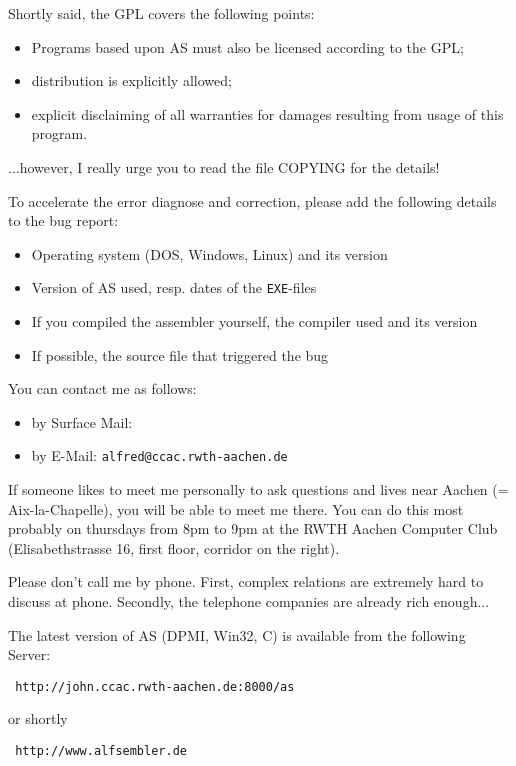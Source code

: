 \documentclass[12pt,twoside]{report}
\newcommand{\tty}[1]{{\tt #1}}
\newcommand{\asname}{{AS}}
\begin{document}
Shortly said, the GPL covers the following points:
\begin{itemize}
\item{Programs based upon \asname{} must also be licensed according to the GPL;}
\item{distribution is explicitly allowed;}
\item{explicit disclaiming of all warranties for damages resulting from
      usage of this program.}
\end{itemize}
...however, I really urge you to read the file COPYING for the details!

To accelerate the error diagnose and correction, please add the
following details to the bug report:
\begin{itemize}
\item{Operating system (DOS, Windows, Linux) and its version}
\item{Version of \asname{} used, resp. dates of the \tty{EXE}-files}
\item{If you compiled the assembler yourself, the compiler used and its version}
\item{If possible, the source file that triggered the bug}
\end{itemize}
You can contact me as follows:
\begin{itemize}
\item{by Surface Mail: }
\item{by E-Mail: \tty{alfred@ccac.rwth-aachen.de}}
\end{itemize}
If someone likes to meet me personally to ask questions and lives
near Aachen (= Aix-la-Chapelle), you will be able to meet me there.
You can do this most probably on thursdays from 8pm to 9pm at the
RWTH Aachen Computer Club (Elisabethstrasse 16, first floor, corridor
on the right).

Please don't call me by phone.  First, complex relations are
extremely hard to discuss at phone.  Secondly, the telephone
companies are already rich enough...

The latest version of \asname{} (DPMI, Win32, C) is available from
the following Server:
\begin{verbatim}
 http://john.ccac.rwth-aachen.de:8000/as
\end{verbatim}
or shortly
\begin{verbatim}
 http://www.alfsembler.de
\end{verbatim}
\end{document}
